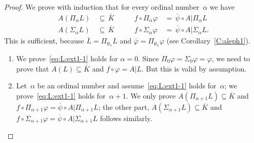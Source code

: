 \documentclass[main.tex]{subfiles}
\begin{document}
\begin{proof}
We prove with induction that for every ordinal number~$\alpha$
we have 
\begin{equation}
\label{eq:L:ext1-1}
\begin{alignedat}{3}
A(\Pi_\alpha L)\,&\subseteq\, \overline{K}&
 \qquad f \circ \Pi_\alpha \varphi 
     \,&=\, \overline \psi \circ A | \Pi_\alpha L \\
A(\Sigma_\alpha L)\,&\subseteq\, \overline{K}&
 \qquad f \circ \Sigma_\alpha \varphi 
     \,&=\, \overline \psi \circ A | \Sigma_\alpha L. 
\end{alignedat}
\end{equation}
This is sufficient, because
$\overline{L}=\Pi_{\aleph_1} L$ and 
 $\overline \varphi = \Pi_{\aleph_1} \varphi$
(see Corollary~\ref{C:aleph1}).

\begin{enumerate}
\item We prove~\eqref{eq:L:ext1-1}
holds for $\alpha=0$.
Since $\Pi_0\varphi = \Sigma_0\varphi = \varphi$,
we need to prove that
$A(L)\subseteq \overline{K}$
and $f\circ \varphi = A| L$.
But this is valid by assumption.

\item
Let~$\alpha$ be an ordinal number
and assume~\eqref{eq:L:ext1-1}
holds for~$\alpha$;
we prove~\eqref{eq:L:ext1-1} holds for~$\alpha+1$.
We  only prove $A(\Pi_{\alpha+1} L) \subseteq \overline{K}$
and $f\circ \Pi_{\alpha+1}\varphi = \overline \psi \circ A|\Pi_{\alpha+1} L$;
the other part, $A(\Sigma_{\alpha+1} L) \subseteq \overline{K}$
and $f\circ \Sigma_{\alpha+1}\varphi 
= \overline\psi \circ A|\Sigma_{\alpha+1}L$
follows similarly.


\end{enumerate}
\end{proof}
\end{document}

